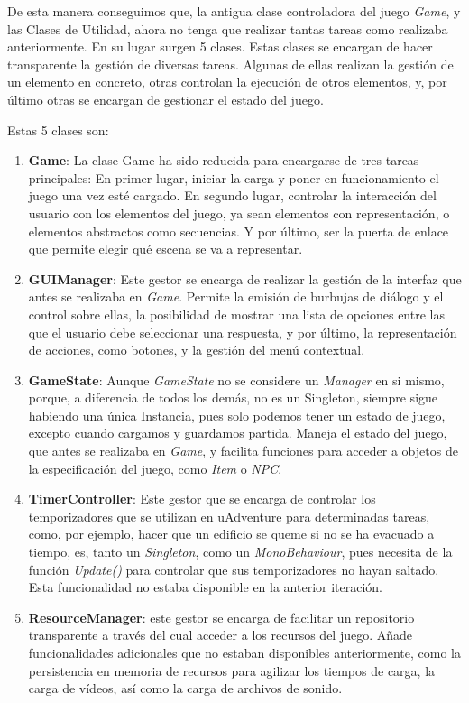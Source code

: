 De esta manera conseguimos que, la antigua clase controladora del juego \textit{Game}, y las Clases de Utilidad, ahora no tenga que realizar tantas tareas como realizaba anteriormente. En su lugar surgen 5 clases. Estas clases se encargan de hacer transparente la gestión de diversas tareas. Algunas de ellas realizan la gestión de un elemento en concreto, otras controlan la ejecución de otros elementos, y, por último otras se encargan de gestionar el estado del juego.

Estas 5 clases son:
\begin{enumerate}
	\item \textbf{Game}: La clase Game ha sido reducida para encargarse de tres tareas principales: En primer lugar, iniciar la carga y poner en funcionamiento el juego una vez esté cargado. En segundo lugar, controlar la interacción del usuario con los elementos del juego, ya sean elementos con representación, o elementos abstractos como secuencias. Y por último, ser la puerta de enlace que permite elegir qué escena se va a representar.
	
	\item \textbf{GUIManager}: Este gestor se encarga de realizar la gestión de la interfaz que antes se realizaba en \textit{Game}. Permite la emisión de burbujas de diálogo y el control sobre ellas, la posibilidad de mostrar una lista de opciones entre las que el usuario debe seleccionar una respuesta, y por último, la representación de acciones, como botones, y la gestión del menú contextual.
	
	\item \textbf{GameState}: Aunque \textit{GameState} no se considere un \textit{Manager} en si mismo, porque, a diferencia de todos los demás, no es un Singleton, siempre sigue habiendo una única Instancia, pues solo podemos tener un estado de juego, excepto cuando cargamos y guardamos partida. Maneja el estado del juego, que antes se realizaba en \textit{Game}, y facilita funciones para acceder a objetos de la especificación del juego, como \textit{Item} o \textit{NPC}.
	
	\item \textbf{TimerController}: Este gestor que se encarga de controlar los temporizadores que se utilizan en uAdventure para determinadas tareas, como, por ejemplo, hacer que un edificio se queme si no se ha evacuado a tiempo, es, tanto un \textit{Singleton}, como un \textit{MonoBehaviour}, pues necesita de la función \textit{Update()} para controlar que sus temporizadores no hayan saltado. Esta funcionalidad no estaba disponible en la anterior iteración.
	
	\item \textbf{ResourceManager}: este gestor se encarga de facilitar un repositorio transparente a través del cual acceder a los recursos del juego. Añade funcionalidades adicionales que no estaban disponibles anteriormente, como la persistencia en memoria de recursos para agilizar los tiempos de carga, la carga de vídeos, así como la carga de archivos de sonido.
\end{enumerate}

